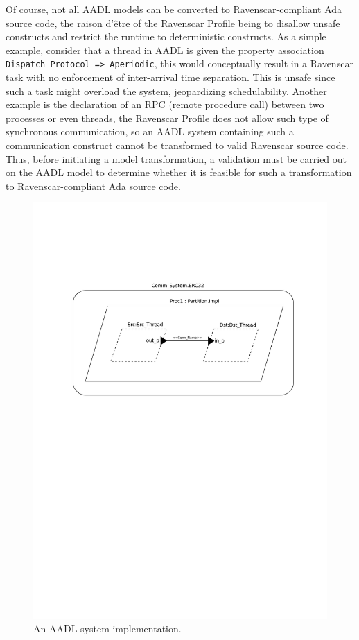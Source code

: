 Of course, not all AADL models can be converted to Ravenscar-compliant
Ada source code, the raison d'\^etre of the Ravenscar Profile being to
disallow unsafe constructs and restrict the runtime to deterministic
constructs. As a simple example, consider that a thread in AADL is
given the property association \texttt{Dispatch\_Protocol =>
  Aperiodic}, this would conceptually result in a Ravenscar task with
no enforcement of inter-arrival time separation. This is unsafe since
such a task might overload the system, jeopardizing
schedulability. Another example is the declaration of an RPC (remote
procedure call) between two processes or even threads, the Ravenscar
Profile does not allow such type of synchronous communication, so an
AADL system containing such a communication construct cannot be
transformed to valid Ravenscar source code. Thus, before initiating a
model transformation, a validation must be carried out on the AADL
model to determine whether it is feasible for such a transformation to
Ravenscar-compliant Ada source code.

\begin{figure}
\centering
\includegraphics[scale=0.7]{figs/aadl_ex}
\caption{An AADL system implementation.}
\label{fig:aadl_ex}
\end{figure}

